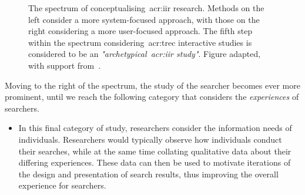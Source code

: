 \begin{itemize}
\end{itemize}

\begin{figure}[t!]
    \centering
    \caption[Spectrum IIR research~\citep{kelly2009iir}]{The spectrum of conceptualising~\gls{acr:iir} research. Methods on the left consider a more system-focused approach, with those on the right considering a more user-focused approach. The fifth step within the spectrum considering~\gls{acr:trec} interactive studies is considered to be an \emph{"archetypical~\gls{acr:iir} study"}. Figure adapted, with support from~\cite{kelly2009iir}.}
    \label{fig:spectrum}
\end{figure}

Moving to the right of the spectrum, the study of the searcher becomes ever more prominent, until we reach the following category that considers the \emph{experiences} of searchers.

\begin{itemize}
    \item[]{\hspace{-6mm}  In this final category of study, researchers consider the information needs of individuals. Researchers would typically observe how individuals conduct their searches, while at the same time collating qualitative data about their differing experiences. These data can then be used to motivate iterations of the design and presentation of search results, thus improving the overall experience for searchers.}
\end{itemize}

